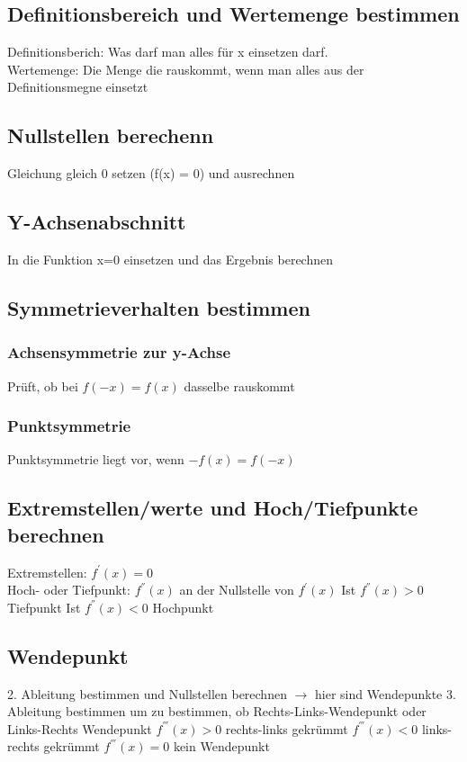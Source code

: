 \documentclass[12pt,a4paper]{article}
\begin{document}
	\subsection{Definitionsbereich und Wertemenge bestimmen}
		Definitionsberich: Was darf man alles für x einsetzen darf. \\
		Wertemenge: Die Menge die rauskommt, wenn man alles aus der Definitionsmegne einsetzt

	\subsection{Nullstellen berechenn}
		Gleichung gleich 0 setzen (f(x) = 0) und ausrechnen

	\subsection{Y-Achsenabschnitt}
		In die Funktion x=0 einsetzen und das Ergebnis berechnen

	\subsection{Symmetrieverhalten bestimmen}
		\subsubsection{Achsensymmetrie zur y-Achse}
			Prüft, ob bei $f(-x)=f(x)$ dasselbe rauskommt
		\subsubsection{Punktsymmetrie}
			Punktsymmetrie liegt vor, wenn $-f(x)=f(-x)$

	\subsection{Extremstellen/werte und Hoch/Tiefpunkte berechnen}
		Extremstellen: $f^{'}(x) = 0$\\
		Hoch- oder Tiefpunkt: $f^{''}(x)$ an der Nullstelle von $f^{'}(x)$ 
			Ist $f^{''}(x)>0$ Tiefpunkt
			Ist $f^{''}(x)<0$ Hochpunkt

	\subsection{Wendepunkt}
		2. Ableitung bestimmen und Nullstellen berechnen $\rightarrow$ hier sind Wendepunkte
		3. Ableitung bestimmen um zu bestimmen, ob Rechts-Links-Wendepunkt oder Links-Rechts Wendepunkt 
			$f^{'''}(x)>0$ rechts-links gekrümmt 
			$f^{'''}(x)<0$ links-rechts gekrümmt
			$f^{'''}(x)=0$ kein Wendepunkt
\end{document}

